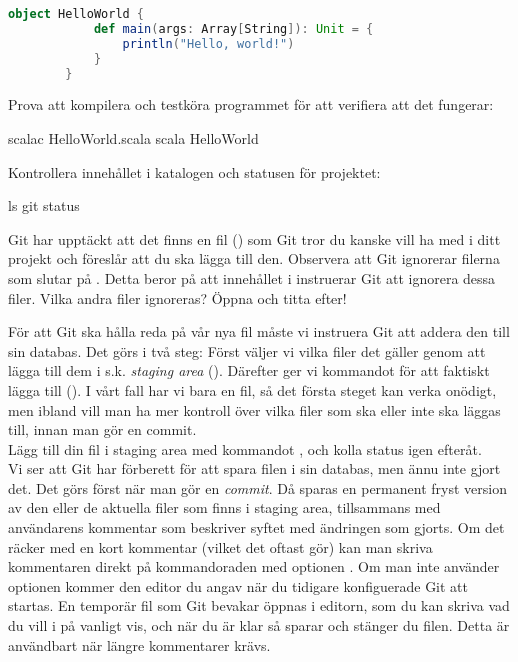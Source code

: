 \begin{Datorarbete}
	\begin{lstlisting}[language=scala]
		object HelloWorld {
			def main(args: Array[String]): Unit = {
				println("Hello, world!")
			}
		}
	\end{lstlisting}

	Prova att kompilera och testköra programmet för att verifiera att det fungerar:

	\begin{Code}
		scalac HelloWorld.scala
		scala HelloWorld
	\end{Code}

	Kontrollera innehållet i katalogen och statusen för projektet:

	\begin{Code}
		ls
		git status
	\end{Code}

	Git har upptäckt att det finns en fil () som Git tror du kanske vill ha med i ditt projekt och föreslår att du ska lägga till den. Observera att Git ignorerar filerna som slutar på . Detta beror på att innehållet i  instruerar Git att ignorera dessa filer. Vilka andra filer ignoreras? Öppna  och titta efter!

	För att Git ska hålla reda på vår nya fil måste vi instruera Git att addera den till sin databas. Det görs i två steg: Först väljer vi vilka filer det gäller genom att lägga till dem i s.k. \emph{staging area} (). Därefter ger vi kommandot för att faktiskt lägga till (). I vårt fall har vi bara en fil, så det första steget kan verka onödigt, men ibland vill man ha mer kontroll över vilka filer som ska eller inte ska läggas till, innan man gör en commit.
	\\

	\code{[\ref{git-add}]} Lägg till din fil i staging area med kommandot , och kolla status igen efteråt.
	\\

	Vi ser att Git har förberett för att spara filen i sin databas, men ännu inte gjort det. Det görs först när man gör en \emph{commit}. Då sparas en permanent fryst version av den eller de aktuella filer som finns i staging area, tillsammans med användarens kommentar som beskriver syftet med ändringen som gjorts. Om det räcker med en kort kommentar (vilket det oftast gör) kan man skriva kommentaren direkt på kommandoraden med optionen .
	Om man inte använder optionen  kommer den editor du angav när du tidigare konfiguerade Git att startas. En temporär fil som Git bevakar öppnas i editorn, som du kan skriva vad du vill i på vanligt vis, och när du är klar så sparar och stänger du filen. Detta är användbart när längre kommentarer krävs.
	\\


\end{Datorarbete}
